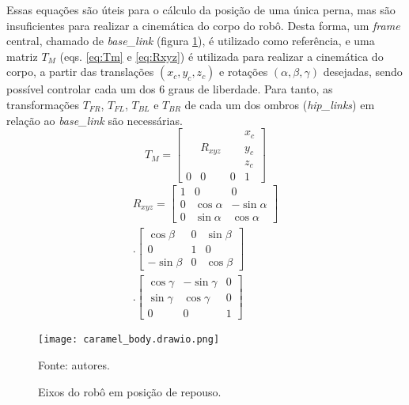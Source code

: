 \documentclass[conference]{IEEEtran}
\begin{document}
Essas equações são úteis para o cálculo da posição de uma única perna, mas são insuficientes para realizar a cinemática do corpo do robô. Desta forma, um \textit{frame} central, chamado de \textit{base\_link} (figura \ref{fig:caramel_body}), é utilizado como referência, e uma matriz $T_M$ (eqs. \ref{eq:Tm} e \ref{eq:Rxyz}) é utilizada para realizar a cinemática do corpo, a partir das translações $(x_c, y_c, z_c)$ e rotações $(\alpha, \beta, \gamma)$ desejadas, sendo possível controlar cada um dos 6 graus de liberdade. Para tanto, as transformações $T_{FR}$, $T_{FL}$, $T_{BL}$ e $T_{BR}$ de cada um dos ombros (\textit{hip\_links}) em relação ao \textit{base\_link} são necessárias.
\begin{equation}
  \label{eq:Tm}
  T_M =
  \begin{bmatrix}
      &         &   & x_c \\
      & R_{xyz} &   & y_c \\
      &         &   & z_c \\
    0 & 0       & 0 & 1
  \end{bmatrix}
\end{equation}
\begin{equation}
  \label{eq:Rxyz}
  \begin{split}
    R_{xyz} =
    \begin{bmatrix}
      1 & 0          & 0           \\
      0 & \cos\alpha & -\sin\alpha \\
      0 & \sin\alpha & \cos\alpha
    \end{bmatrix}
    \\.
    \begin{bmatrix}
      \cos\beta  & 0 & \sin\beta \\
      0          & 1 & 0         \\
      -\sin\beta & 0 & \cos\beta
    \end{bmatrix}
    \\.
    \begin{bmatrix}
      \cos\gamma & -\sin\gamma & 0 \\
      \sin\gamma & \cos\gamma  & 0 \\
      0          & 0           & 1
    \end{bmatrix}
  \end{split}
\end{equation}

\begin{figure}[htbp]
  \centering
  \vspace{-0.75cm}
  \texttt{[image: caramel\_body.drawio.png]}
  
  \caption{Eixos do robô em posição de repouso.}
  Fonte: autores.
  \label{fig:caramel_body}
\end{figure}
\end{document}
